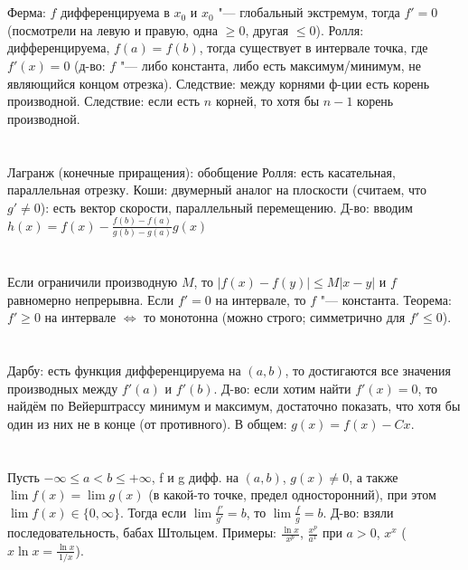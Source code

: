 \section{} %
Ферма: $f$ дифференцируема в $x_0$ и $x_0$ "--- глобальный экстремум, тогда $f'=0$ (посмотрели
на левую и правую, одна $\ge0$, другая $\le0$).
Ролля: дифференцируема, $f(a)=f(b)$, тогда существует в интервале точка, где $f'(x)=0$
(д-во: $f$ "--- либо константа, либо есть максимум/минимум, не являющийся концом отрезка).
Следствие: между корнями ф-ции есть корень производной. Следствие: если есть $n$ корней,
то хотя бы $n-1$ корень производной.

\section{} %
Лагранж (конечные приращения): обобщение Ролля: есть касательная, параллельная отрезку.
Коши: двумерный аналог на плоскости (считаем, что $g' \neq 0$): есть вектор скорости, параллельный
перемещению. Д-во: вводим $h(x) = f(x) - \frac{f(b)-f(a)}{g(b)-g(a)}g(x)$

\section{} %
Если ограничили производную $M$, то $|f(x)-f(y)| \le M|x-y|$ и $f$ равномерно непрерывна.
Если $f'=0$ на интервале, то $f$ "--- константа. Теорема: $f'\ge0$ на интервале $\iff$ то монотонна (можно строго;
симметрично для $f'\le 0$).

\section{} %
Дарбу: есть функция дифференцируема на $(a,b)$, то достигаются все значения производных
между $f'(a)$ и $f'(b)$. Д-во: если хотим найти $f'(x)=0$, то найдём по Вейерштрассу
минимум и максимум, достаточно показать, что хотя бы один из них не в конце (от противного).
В общем: $g(x)=f(x)-Cx$.

\section{} %
Пусть $-\infty \le a < b \le +\infty$, f и g дифф. на $(a,b)$, $g(x) \neq 0$, а
также $\lim f(x) = \lim g(x)$ (в какой-то точке, предел односторонний), при этом $\lim f(x) \in \{0, \infty\}$.
Тогда если $\lim \frac{f'}{g'} = b$, то $\lim \frac{f}{g} = b$. Д-во: взяли последовательность, бабах Штольцем.
Примеры: $\frac{\ln x}{x^p}$, $\frac{x^p}{a^x}$ при $a>0$, $x^x$ ($x\ln x = \frac{\ln x}{1/x}$).

